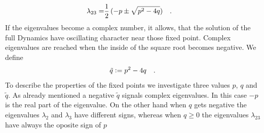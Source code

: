\documentclass{article}
\begin{document}
\begin{align*}
    \lambda_{23}=&\frac{1}{2}\,(-p\pm\sqrt{p^2-4q})\quad.
\end{align*}
If the eigenvalues become a complex number, it allows, that the solution of the full Dynamics have oscillating character near those fixed point. Complex eigenvalues are reached when the inside of the square root becomes negative. We define
\begin{align*}
    \tilde{q}\vcentcolon=p^2-4q\quad.
\end{align*}
To describe the properties of the fixed points we investigate three values $p$, $q$ and $\tilde{q}$. As already mentioned a negative $\tilde{q}$ signals complex eigenvalues. In this case $-p$ is the real part of the eigenvalue. On the other hand when $q$ gets negative the eigenvalues $\lambda_2$ and $\lambda_3$ have different signs, whereas when $q\geq0$ the eigenvalues $\lambda_{23}$ have always the oposite sign of $p$
\end{document}

